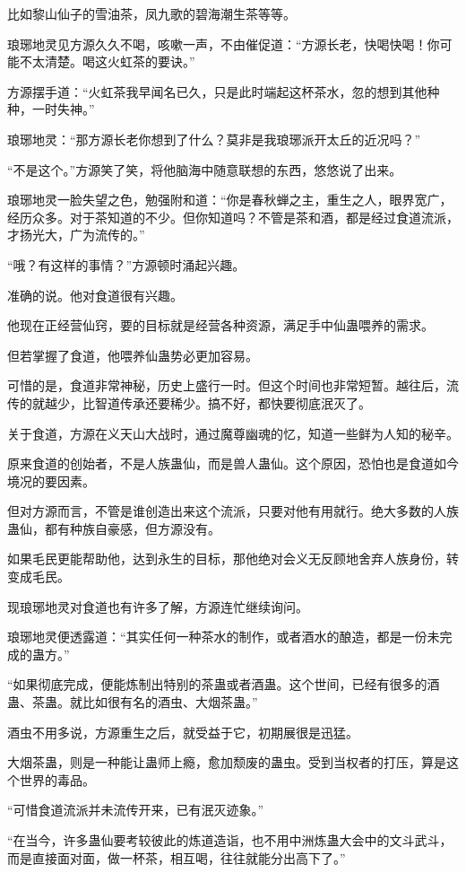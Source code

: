 \begin{this_body}
比如黎山仙子的雪油茶，凤九歌的碧海潮生茶等等。

琅琊地灵见方源久久不喝，咳嗽一声，不由催促道：“方源长老，快喝快喝！你可能不太清楚。喝这火虹茶的要诀。”

方源摆手道：“火虹茶我早闻名已久，只是此时端起这杯茶水，忽的想到其他种种，一时失神。”

琅琊地灵：“那方源长老你想到了什么？莫非是我琅琊派开太丘的近况吗？”

“不是这个。”方源笑了笑，将他脑海中随意联想的东西，悠悠说了出来。

琅琊地灵一脸失望之色，勉强附和道：“你是春秋蝉之主，重生之人，眼界宽广，经历众多。对于茶知道的不少。但你知道吗？不管是茶和酒，都是经过食道流派，才扬光大，广为流传的。”

“哦？有这样的事情？”方源顿时涌起兴趣。

准确的说。他对食道很有兴趣。

他现在正经营仙窍，要的目标就是经营各种资源，满足手中仙蛊喂养的需求。

但若掌握了食道，他喂养仙蛊势必更加容易。

可惜的是，食道非常神秘，历史上盛行一时。但这个时间也非常短暂。越往后，流传的就越少，比智道传承还要稀少。搞不好，都快要彻底泯灭了。

关于食道，方源在义天山大战时，通过魔尊幽魂的忆，知道一些鲜为人知的秘辛。

原来食道的创始者，不是人族蛊仙，而是兽人蛊仙。这个原因，恐怕也是食道如今境况的要因素。

但对方源而言，不管是谁创造出来这个流派，只要对他有用就行。绝大多数的人族蛊仙，都有种族自豪感，但方源没有。

如果毛民更能帮助他，达到永生的目标，那他绝对会义无反顾地舍弃人族身份，转变成毛民。

现琅琊地灵对食道也有许多了解，方源连忙继续询问。

琅琊地灵便透露道：“其实任何一种茶水的制作，或者酒水的酿造，都是一份未完成的蛊方。”

“如果彻底完成，便能炼制出特别的茶蛊或者酒蛊。这个世间，已经有很多的酒蛊、茶蛊。就比如很有名的酒虫、大烟茶蛊。”

酒虫不用多说，方源重生之后，就受益于它，初期展很是迅猛。

大烟茶蛊，则是一种能让蛊师上瘾，愈加颓废的蛊虫。受到当权者的打压，算是这个世界的毒品。

“可惜食道流派并未流传开来，已有泯灭迹象。”

“在当今，许多蛊仙要考较彼此的炼道造诣，也不用中洲炼蛊大会中的文斗武斗，而是直接面对面，做一杯茶，相互喝，往往就能分出高下了。”


\end{this_body}
